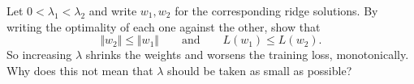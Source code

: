 


\begin{exercise}[$\star\star$]
Let $0 < \lambda_1 < \lambda_2$ and write $w_1, w_2$ for the corresponding ridge
solutions. By writing the optimality of each one against the other, show that
\[
\Vert w_2 \Vert \leq \Vert w_1 \Vert
\qquad \text{and} \qquad
L(w_1) \leq L(w_2) .
\]
So increasing $\lambda$ shrinks the weights and worsens the training loss,
monotonically. Why does this not mean that $\lambda$ should be taken as small as
possible?
\end{exercise}
